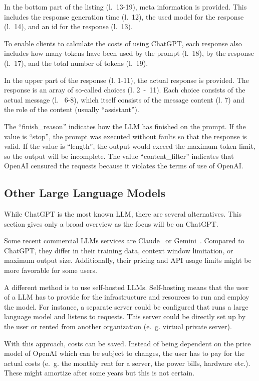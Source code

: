 In the bottom part of the listing (l.~13-19), meta information is provided. This includes the response generation time (l.~12), the used model for the response (l.~14), and an id for the response (l.~13).

To enable clients to calculate the costs of using ChatGPT, each response also includes how many tokens have been used by the prompt (l.~18), by the response (l.~17), and the total number of tokens (l.~19).

In the upper part of the response (l. 1-11), the actual response is provided. The response is an array of so-called choices (l. 2~-~11). Each choice consists of the actual message (l.~ 6-8), which itself consists of the message content (l. 7) and the role of the content (usually \enquote{assistant}).

The \enquote{finish\_reason} indicates how the \ac{LLM} has finished on the prompt. If the value is \enquote{stop}, the prompt was executed without faults so that the response is valid. If the value is \enquote{length}, the output would exceed the maximum token limit, so the output will be incomplete. The value \enquote{content\_filter} indicates that OpenAI censured the requests because it violates the terms of use of OpenAI.~\cite{ChatGPT_url}


\subsection{Other Large Language Models}\label{sec:other_llm}

While ChatGPT is the most known \ac{LLM}, there are several alternatives. This section gives only a broad overview as the focus will be on ChatGPT.

Some recent commercial \acp{LLM} services are Claude~\cite{claude} or Gemini~\cite{gemini}. Compared to ChatGPT, they differ in their training data, context window limitation, or maximum output size. Additionally, their pricing and API usage limits might be more favorable for some users.

A different method  is to use self-hosted \acp{LLM}.
Self-hosting means that the user of a \ac{LLM} has to provide for the infrastructure and resources to run and employ the model. For instance, a separate server could be configured that runs a large language model and listens to requests. This server could be directly set up by the user or rented from another organization (e.~g. virtual private server). 

With this approach, costs can be saved. Instead of being dependent on the price model of OpenAI which can be subject to changes, the user has to pay for the actual costs (e.~g. the monthly rent for a server, the power bills, hardware etc.). These might amortize after some years but this is not certain.


